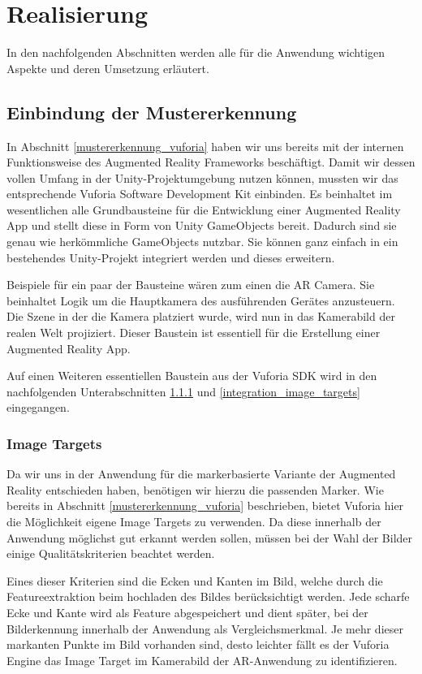 \chapter{Realisierung}\label{ch:realisierung_der_anwendung}
In den nachfolgenden Abschnitten werden alle für die Anwendung wichtigen Aspekte und deren Umsetzung erläutert. 

\section{Einbindung der Mustererkennung}\label{einbindung_mustererkennung}
In Abschnitt \ref{mustererkennung_vuforia} haben wir uns bereits mit der internen Funktionsweise des Augmented Reality Frameworks  beschäftigt. 
Damit wir dessen vollen Umfang in der Unity-Projektumgebung nutzen können, mussten wir das entsprechende Vuforia Software Development Kit einbinden.
Es beinhaltet im wesentlichen alle Grundbausteine für die Entwicklung einer Augmented Reality App und stellt diese in Form von Unity GameObjects bereit. 
Dadurch sind sie genau wie herkömmliche GameObjects nutzbar.
Sie können ganz einfach in ein bestehendes Unity-Projekt integriert werden und dieses erweitern.

Beispiele für ein paar der Bausteine wären zum einen die AR Camera. 
Sie beinhaltet Logik um die Hauptkamera des ausführenden Gerätes anzusteuern. Die Szene in der die Kamera platziert wurde, wird nun in das Kamerabild der realen Welt projiziert.
Dieser Baustein ist essentiell für die Erstellung einer Augmented Reality App. 

Auf einen Weiteren essentiellen Baustein aus der Vuforia SDK wird in den nachfolgenden Unterabschnitten \ref{image_targets} und \ref{integration_image_targets} eingegangen. 

\subsection{Image Targets}\label{image_targets}
Da wir uns in der Anwendung für die markerbasierte Variante der Augmented Reality entschieden haben, benötigen wir hierzu die passenden Marker. 
Wie bereits in Abschnitt \ref{mustererkennung_vuforia} beschrieben, bietet Vuforia hier die Möglichkeit eigene Image Targets zu verwenden. 
Da diese innerhalb der Anwendung möglichst gut erkannt werden sollen, müssen bei der Wahl der Bilder einige Qualitätskriterien beachtet werden.

Eines dieser Kriterien sind die Ecken und Kanten im Bild, welche durch die Featureextraktion beim hochladen des Bildes berücksichtigt werden. 
Jede scharfe Ecke und Kante wird als Feature abgespeichert und dient später, bei der Bilderkennung innerhalb der Anwendung als Vergleichsmerkmal. 
Je mehr dieser markanten Punkte im Bild vorhanden sind, desto leichter fällt es der Vuforia Engine das Image Target im Kamerabild der AR-Anwendung zu identifizieren.

